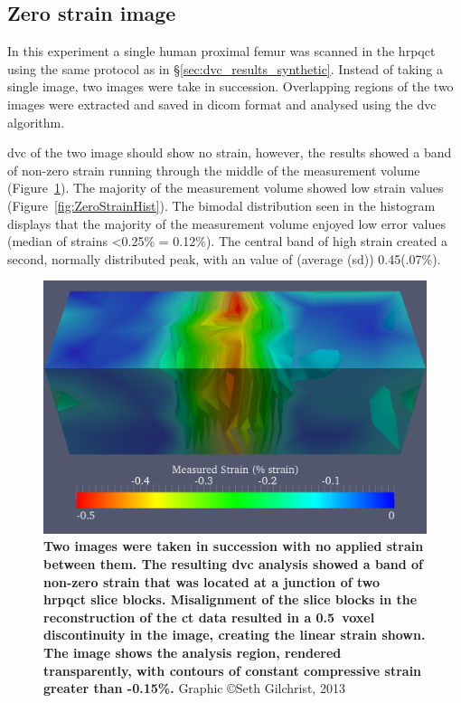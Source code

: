 \subsection{Zero strain image}
\label{sec:dvc_results_zero}
In this experiment a single human proximal femur was scanned in the \ac{hrpqct} using the same protocol as in \S\ref{sec:dvc_results_synthetic}.
Instead of taking a single image, two images were take in succession.
Overlapping regions of the two images were extracted and saved in \ac{dicom} format and analysed using the \ac{dvc} algorithm.

\ac{dvc} of the two image should show no strain, however, the results showed a band of non-zero strain running through the middle of the measurement volume (Figure~\ref{fig:ZeroStrain}).
The majority of the measurement volume showed low strain values (Figure~\ref{fig:ZeroStrainHist}).
The bimodal distribution seen in the histogram displays that the majority of the measurement volume enjoyed low error values (median of strains \textless 0.25\% = 0.12\%).
The central band of high strain created a second, normally distributed peak, with an value of (average (\ac{sd})) 0.45(.07\%).

\begin{figure}
\centering
\includegraphics[width=0.8\linewidth]{./appendixDvc/figures/ZeroStrain}
\caption[Zero strain results]{\textbf{Two images were taken in succession with no applied strain between them. The resulting \acs*{dvc} analysis showed a band of non-zero strain that was located at a junction of two \acs*{hrpqct} slice blocks. Misalignment of the slice blocks in the reconstruction of the \ac{ct} data resulted in a 0.5~voxel discontinuity in the image, creating the linear strain shown. The image shows the analysis region, rendered transparently, with contours of constant compressive strain greater than -0.15\%.} Graphic \copyright Seth Gilchrist, 2013}
\label{fig:ZeroStrain}
\end{figure}

